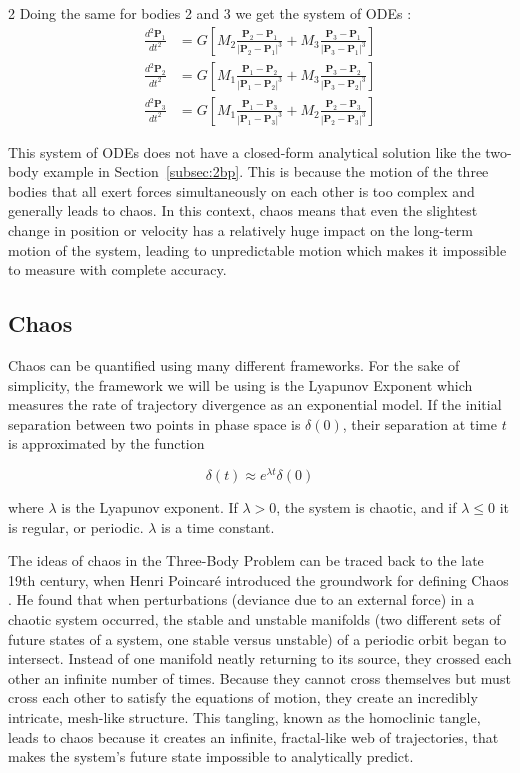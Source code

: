 \documentclass{article}
\begin{document}
\begin{multicols}{2}
Doing the same for bodies 2 and 3 we get the system of ODEs \citep{murray1999solar}:
\begin{align*}
\frac{d^2\mathbf{P}_1}{dt^2} &= G \left[ M_2 \frac{\mathbf{P}_2 - \mathbf{P}_1}{|\mathbf{P}_2 - \mathbf{P}_1|^3} + M_3 \frac{\mathbf{P}_3 - \mathbf{P}_1}{|\mathbf{P}_3 - \mathbf{P}_1|^3} \right] \\[1em]
\frac{d^2\mathbf{P}_2}{dt^2} &= G \left[ M_1 \frac{\mathbf{P}_1 - \mathbf{P}_2}{|\mathbf{P}_1 - \mathbf{P}_2|^3} + M_3 \frac{\mathbf{P}_3 - \mathbf{P}_2}{|\mathbf{P}_3 - \mathbf{P}_2|^3} \right] \\[1em]
\frac{d^2\mathbf{P}_3}{dt^2} &= G \left[ M_1 \frac{\mathbf{P}_1 - \mathbf{P}_3}{|\mathbf{P}_1 - \mathbf{P}_3|^3} + M_2 \frac{\mathbf{P}_2 - \mathbf{P}_3}{|\mathbf{P}_2 - \mathbf{P}_3|^3} \right]
\end{align*}

This system of ODEs does not have a closed-form analytical solution like the two-body example in Section~\ref{subsec:2bp}. This is because the motion of the three bodies that all exert forces simultaneously on each other is too complex and generally leads to chaos. In this context, chaos means that even the slightest change in position or velocity has a relatively huge impact on the long-term motion of the system, leading to unpredictable motion which makes it impossible to measure with complete accuracy.

\subsection{Chaos}
\label{Chaos}
Chaos can be quantified using many different frameworks. For the sake of simplicity, the framework we will be using is the Lyapunov Exponent \citep{ott2002chaos} which measures the rate of trajectory divergence as an exponential model. If the initial separation between two points in phase space is $\delta(0)$, their separation at time $t$ is approximated by the function

$$\delta(t) \approx e^{\lambda t} \delta(0)$$

where $\lambda$ is the Lyapunov exponent. If $\lambda > 0$, the system is chaotic, and if $\lambda \leq 0$ it is regular, or periodic. $\lambda$ is a time constant. 

The ideas of chaos in the Three-Body Problem can be traced back to the late 19th century, when Henri Poincaré introduced the groundwork for defining Chaos \citep{poincare1890sur}. He found that when perturbations (deviance due to an external force) in a chaotic system occurred, the stable and unstable manifolds (two different sets of future states of a system, one stable versus unstable) of a periodic orbit began to intersect. Instead of one manifold neatly returning to its source, they crossed each other an infinite number of times. Because they cannot cross themselves but must cross each other to satisfy the equations of motion, they create an incredibly intricate, mesh-like structure. This tangling, known as the homoclinic tangle, leads to chaos because it creates an infinite, fractal-like web of trajectories, that makes the system's future state impossible to analytically predict. 


\end{multicols}
\end{document}
